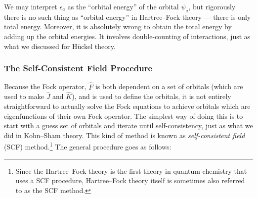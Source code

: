 \documentclass{article}
\theoremstyle{plain}\theoremheaderfont{\normalfont\itshape}\theorembodyfont{\rmfamily}\theoremseparator{.}\newtheorem*{rem}{Remark}\newtheorem*{ex}{Example}\newtheorem*{proof}{Proof}\newtheorem*{altp}{Alternative proof}
\theoremstyle{plain}\theoremheaderfont{\normalfont\bfseries}\theorembodyfont{\rmfamily}\theoremseparator{.}\newtheorem{thm}{Theorem}[section]\newtheorem{lem}[thm]{Lemma}\newtheorem{prop}[thm]{Proposition}\newtheorem*{cor}{Corollary}\newtheorem{defn}[thm]{Definition}\newtheorem{clm}[thm]{Claim}\newtheorem{clminproof}{Claim}\newtheorem{pos}{Postulate}[section]
\theoremstyle{break}\theoremheaderfont{\normalfont\itshape}\theorembodyfont{\rmfamily}\theoremseparator{.\medskip}\newtheorem*{proofskip}{Proof}\newtheorem*{exs}{Examples}\newtheorem*{rems}{Remarks}
\theoremstyle{break}\theoremheaderfont{\normalfont\bfseries}\theorembodyfont{\rmfamily}\theoremseparator{.\medskip}\newtheorem{lemskip}[thm]{Lemma}\newtheorem{defnskip}[thm]{Definition}\newtheorem{propskip}[thm]{Proposition}\newtheorem{thmskip}[thm]{Theorem}
\numberwithin{equation}{section}
\begin{document}
    We may interpret \(\epsilon_a\) as the ``orbital energy'' of the orbital \(\psi_a\), but rigorously there is no such thing as ``orbital energy'' in Hartree--Fock theory --- there is only total energy. Moreover, it is absolutely wrong to obtain the total energy by adding up the orbital energies. It involves double-counting of interactions, just as what we discussed for H\"{u}ckel theory.

    \subsubsection{The Self-Consistent Field Procedure}
    Because the Fock operator, \(\hat{F}\) is both dependent on a set of orbitals (which are used to make \(\hat{J}\) and \(\hat{K}\)), and is used to define the orbitals, it is not entirely straightforward to actually solve the Fock equations to achieve orbitals which are eigenfunctions of their own Fock operator. The simplest way of doing this is to start with a guess set of orbitals and iterate until self-consistency, just as what we did in Kohn--Sham theory. This kind of method is known as \textit{self-consistent field} (SCF) method.\footnote{Since the Hartree--Fock theory is the first theory in quantum chemistry that uses a SCF procedure, Hartree--Fock theory itself is sometimes also referred to as the SCF method.} The general procedure goes as follows:
\end{document}
